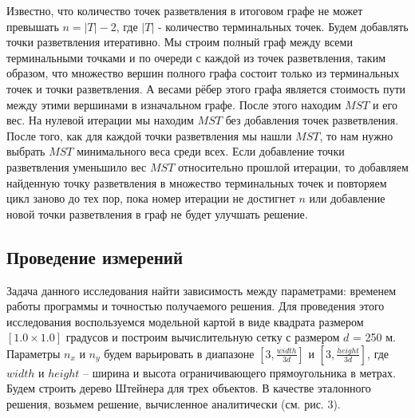 Известно, что количество точек разветвления в итоговом графе не может превышать $n = |T| - 2$, где $|T|$ - количество терминальных точек. Будем добавлять точки разветвления итеративно. Мы строим полный граф между всеми терминальными точками и по очереди с каждой из точек разветвления, таким образом, что множество вершин полного графа состоит только из терминальных точек и точки разветвления. А весами рёбер этого графа является стоимость пути между этими вершинами в изначальном графе. После этого находим $MST$ и его вес. На нулевой итерации мы находим $MST$ без добавления точек разветвления. После того, как для каждой точки разветвления мы нашли $MST$, то нам нужно выбрать $MST$ минимального веса среди всех. Если добавление точки разветвления уменьшило вес $MST$ относительно прошлой итерации, то добавляем найденную точку разветвления в множество терминальных точек и повторяем цикл заново до тех пор, пока номер итерации не достигнет $n$ или добавление новой точки разветвления в граф не будет улучшать решение.\\
%	
%		
%		


\subsection*{\Large{Проведение измерений}}
Задача данного исследования найти зависимость между параметрами: временем работы программы и точностью получаемого решения. Для проведения этого исследования воспользуемся модельной картой в виде квадрата размером $[1.0 \times 1.0]$ градусов и построим вычислительную сетку с размером $d$ = 250 м. Параметры $n_x$  и $n_y$  будем варьировать в диапазоне $[3, \frac{width}{3d}]$ и $[3, \frac{height}{3d}]$, где $width$ и $height$ – ширина и высота ограничивающего прямоугольника в метрах. Будем строить дерево Штейнера для трех объектов. В качестве эталонного решения, возьмем решение, вычисленное аналитически (см. рис. 3).

